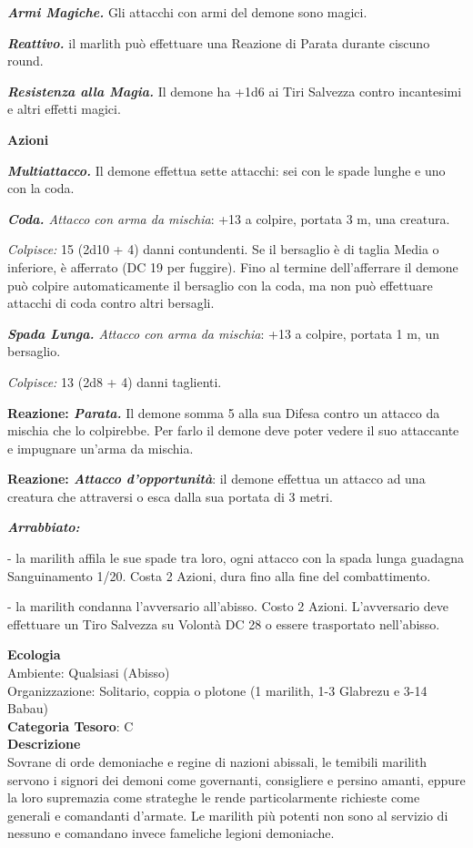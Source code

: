 \begin{multicols}{2}
{\emph{\textbf{Armi Magiche.}} Gli attacchi con armi del demone sono magici.

\emph{\textbf{Reattivo.}} il marlith può effettuare una Reazione di Parata durante ciscuno round.

\emph{\textbf{Resistenza alla Magia.}} Il demone ha +1d6 ai Tiri Salvezza contro incantesimi e altri effetti magici.

\textbf{Azioni}

\emph{\textbf{Multiattacco.}} Il demone effettua sette attacchi: sei con le spade lunghe e uno con la coda.

\emph{\textbf{Coda.} Attacco con arma da mischia}: +13 a colpire, portata 3 m, una creatura.

\emph{Colpisce:} 15 (2d10 + 4) danni contundenti. Se il bersaglio è di taglia Media o inferiore, è afferrato (DC 19 per fuggire). Fino al termine dell'afferrare il demone può colpire automaticamente il bersaglio con la coda, ma non può effettuare attacchi di coda contro altri bersagli.

\emph{\textbf{Spada Lunga.} Attacco con arma da mischia}: +13 a colpire, portata 1 m, un bersaglio.

\emph{Colpisce:} 13 (2d8 + 4) danni taglienti.

\textbf{Reazione: \emph{Parata.}} Il demone somma 5 alla sua Difesa contro un attacco da mischia che lo colpirebbe. Per farlo il demone deve poter vedere il suo attaccante e impugnare un'arma da mischia.

\textbf{Reazione: \emph{Attacco d'opportunità}}: il demone effettua un attacco ad una creatura che attraversi o esca dalla sua portata di 3 metri.

\emph{\textbf{Arrabbiato:}}

- la marilith affila le sue spade tra loro, ogni attacco con la spada lunga guadagna Sanguinamento 1/20. Costa 2 Azioni, dura fino alla fine del combattimento.

- la marilith condanna l'avversario all'abisso. Costo 2 Azioni. L'avversario deve effettuare un Tiro Salvezza su Volontà DC 28 o essere trasportato nell'abisso.

\textbf{Ecologia}\\
Ambiente: Qualsiasi (Abisso)\\
Organizzazione: Solitario, coppia o plotone (1 marilith, 1-3 Glabrezu e 3-14 Babau)\\
\textbf{Categoria Tesoro}: C\\
\textbf{Descrizione}\\
Sovrane di orde demoniache e regine di nazioni abissali, le temibili marilith servono i signori dei demoni come governanti, consigliere e persino amanti, eppure la loro supremazia come strateghe le rende particolarmente richieste come generali e comandanti d'armate. Le marilith più potenti non sono al servizio di nessuno e comandano invece fameliche legioni demoniache.

}
\end{multicols}
